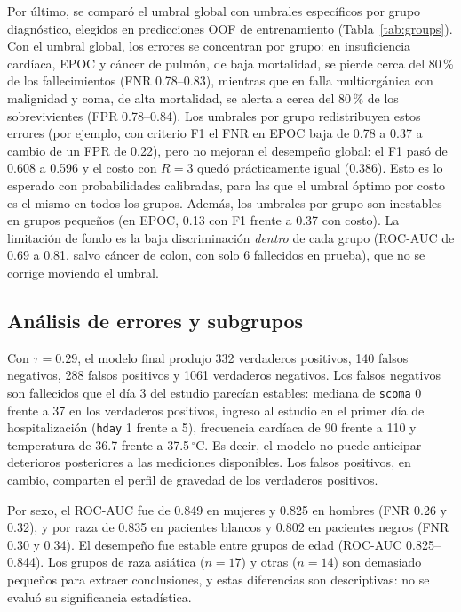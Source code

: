 \documentclass[conference]{IEEEtran}
\begin{document}
Por último, se comparó el umbral global con umbrales específicos por grupo diagnóstico, elegidos en predicciones OOF de entrenamiento (Tabla~\ref{tab:groups}). Con el umbral global, los errores se concentran por grupo: en insuficiencia cardíaca, EPOC y cáncer de pulmón, de baja mortalidad, se pierde cerca del 80\,\% de los fallecimientos (FNR 0.78--0.83), mientras que en falla multiorgánica con malignidad y coma, de alta mortalidad, se alerta a cerca del 80\,\% de los sobrevivientes (FPR 0.78--0.84). Los umbrales por grupo redistribuyen estos errores (por ejemplo, con criterio F1 el FNR en EPOC baja de 0.78 a 0.37 a cambio de un FPR de 0.22), pero no mejoran el desempeño global: el F1 pasó de 0.608 a 0.596 y el costo con $R=3$ quedó prácticamente igual (0.386). Esto es lo esperado con probabilidades calibradas, para las que el umbral óptimo por costo es el mismo en todos los grupos. Además, los umbrales por grupo son inestables en grupos pequeños (en EPOC, 0.13 con F1 frente a 0.37 con costo). La limitación de fondo es la baja discriminación \emph{dentro} de cada grupo (ROC-AUC de 0.69 a 0.81, salvo cáncer de colon, con solo 6 fallecidos en prueba), que no se corrige moviendo el umbral.



\subsection{Análisis de errores y subgrupos}
Con $\tau=0.29$, el modelo final produjo 332 verdaderos positivos, 140 falsos negativos, 288 falsos positivos y 1061 verdaderos negativos. Los falsos negativos son fallecidos que el día 3 del estudio parecían estables: mediana de \texttt{scoma} 0 frente a 37 en los verdaderos positivos, ingreso al estudio en el primer día de hospitalización (\texttt{hday} 1 frente a 5), frecuencia cardíaca de 90 frente a 110 y temperatura de 36.7 frente a 37.5\,$^{\circ}$C. Es decir, el modelo no puede anticipar deterioros posteriores a las mediciones disponibles. Los falsos positivos, en cambio, comparten el perfil de gravedad de los verdaderos positivos.

Por sexo, el ROC-AUC fue de 0.849 en mujeres y 0.825 en hombres (FNR 0.26 y 0.32), y por raza de 0.835 en pacientes blancos y 0.802 en pacientes negros (FNR 0.30 y 0.34). El desempeño fue estable entre grupos de edad (ROC-AUC 0.825--0.844). Los grupos de raza asiática ($n=17$) y otras ($n=14$) son demasiado pequeños para extraer conclusiones, y estas diferencias son descriptivas: no se evaluó su significancia estadística.
\end{document}
